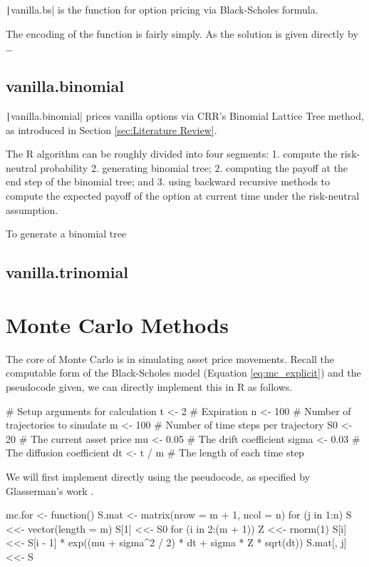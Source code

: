 \texttt|vanilla.bs| is the function for option pricing via Black-Scholes formula.

The encoding of the function is fairly simply. As the solution is given directly by \dots

\subsection{vanilla.binomial}

\texttt|vanilla.binomial| prices vanilla options via CRR's Binomial Lattice Tree method, as introduced in Section \ref{sec:Literature Review}.

The R algorithm can be roughly divided into four segments: 1. compute the risk-neutral probability 2. generating binomial tree; 2. computing the payoff at the end step of the binomial tree; and 3. using backward recursive methods to compute the expected payoff of the option at current time under the risk-neutral assumption.

To generate a binomial tree

\subsection{vanilla.trinomial}

\section{Monte Carlo Methods}

The core of Monte Carlo is in simulating asset price movements. Recall the computable form of the Black-Scholes model (Equation \ref{eq:mc_explicit}) and the pseudocode given, we can directly implement this in R as follows.

\begin{Rminted}
# Setup arguments for calculation
t <- 2 # Expiration
n <- 100 # Number of trajectories to simulate
m <- 100 # Number of time steps per trajectory
S0 <- 20 # The current asset price
mu <- 0.05 # The drift coefficient
sigma <- 0.03 # The diffusion coefficient
dt <- t / m # The length of each time step
\end{Rminted}

We will first implement directly using the pseudocode, as specified by Glasserman's work \cite{Glasserman2003}.

\begin{Rminted}
mc.for <- function() {
    S.mat <- matrix(nrow = m + 1, ncol = n)
    for (j in 1:n) {
        S <<- vector(length = m)
        S[1] <<- S0
        for (i in 2:(m + 1)) {
            Z <<- rnorm(1)
            S[i] <<- S[i - 1] * exp((mu + sigma^2 / 2) * dt + sigma * Z * sqrt(dt))
        }
        S.mat[, j] <<- S
    }
}
\end{Rminted}

